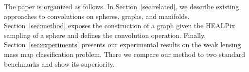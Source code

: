 \documentclass[final,twocolumn,3p,times,authoryear]{elsarticle}
\newcommand{\todo}[1]{{\color[rgb]{.6,.1,.6}{#1}}}
\newcommand{\assign}[1]{{\color[rgb]{.8,.5,.8}{Assigned: #1 }}}
\newcommand{\secref}[1]{Section~\ref{sec:#1}}
\newcommand{\1}{\b{1}}              %
\newcommand{\0}{\b{0}}              %
\begin{document}
The paper is organized as follows.
In \secref{related}, we describe existing approaches to convolutions on spheres, graphs, and manifolds.
\secref{method} exposes the construction of a graph given the HEALPix sampling of a sphere and defines the convolution operation.
Finally, \secref{experiments} presents our experimental results on the weak lensing mass map classification problem. There we compare our method to two standard benchmarks and show its superiority.





\end{document}
